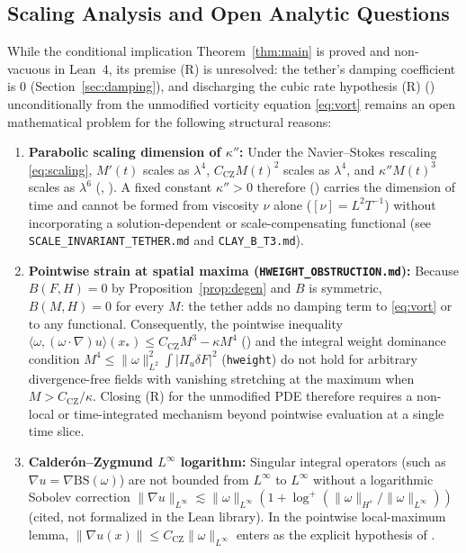 \documentclass[11pt,a4paper]{article}
\theoremstyle{plain}
\theoremstyle{definition}
\theoremstyle{remark}
\newcommand{\CZ}{C_{\mathrm{CZ}}}
\begin{document}
\subsection{Scaling Analysis and Open Analytic Questions}\label{sec:obstruction}\label{sec:open}
While the conditional implication Theorem~\ref{thm:main} is proved and non-vacuous in Lean~4, its premise (R) is unresolved: the tether's damping coefficient is $0$ (Section~\ref{sec:damping}), and discharging the cubic rate hypothesis (R) () unconditionally from the unmodified vorticity equation \eqref{eq:vort} remains an open mathematical problem for the following structural reasons:
\begin{enumerate}
\item \textbf{Parabolic scaling dimension of $\kappa''$:} Under the Navier--Stokes rescaling \eqref{eq:scaling}, $M'(t)$ scales as $\lambda^4$, $\CZ M(t)^2$ scales as $\lambda^4$, and $\kappa'' M(t)^3$ scales as $\lambda^6$ (, ). A fixed constant $\kappa''>0$ therefore () carries the dimension of time and cannot be formed from viscosity $\nu$ alone ($[\nu]=L^2T^{-1}$) without incorporating a solution-dependent or scale-compensating functional (see \texttt{SCALE\_INVARIANT\_TETHER.md} and \texttt{CLAY\_B\_T3.md}).
\item \textbf{Pointwise strain at spatial maxima (\texttt{HWEIGHT\_OBSTRUCTION.md}):} Because $B(F,H)=0$ by Proposition~\ref{prop:degen} and $B$ is symmetric, $B(M,H)=0$ for every $M$: the tether adds no damping term to \eqref{eq:vort} or to any functional. Consequently, the pointwise inequality $\langle\omega,(\omega\cdot\nabla)u\rangle(x_*)\le\CZ M^3-\kappa M^4$ () and the integral weight dominance condition $M^4\le\|\omega\|_{L^2}^2\int|\Pi_u\delta F|^2$ (\texttt{hweight}) do not hold for arbitrary divergence-free fields with vanishing stretching at the maximum when $M>\CZ/\kappa$. Closing (R) for the unmodified PDE therefore requires a non-local or time-integrated mechanism beyond pointwise evaluation at a single time slice.
\item \textbf{Calderón--Zygmund $L^\infty$ logarithm:} Singular integral operators (such as $\nabla u=\nabla\mathrm{BS}(\omega)$) are not bounded from $L^\infty$ to $L^\infty$ without a logarithmic Sobolev correction $\|\nabla u\|_{L^\infty}\lesssim \|\omega\|_{L^\infty}(1+\log^+(\|\omega\|_{H^s}/\|\omega\|_{L^\infty}))$ \cite{BKM1984} (cited, not formalized in the Lean library). In the pointwise local-maximum lemma, $\|\nabla u(x)\|\le\CZ\|\omega\|_{L^\infty}$ enters as the explicit hypothesis  of .
\end{enumerate}
\end{document}

